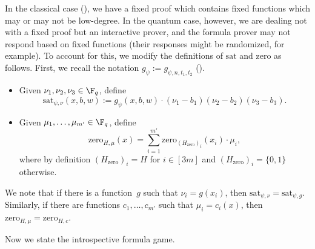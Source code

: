 \begin{notation}\label{not:annoying-technicality}
In the classical case (),
we have a fixed proof which contains fixed functions which may or may not be low-degree.
In the quantum case, however, we are dealing not with a fixed proof but an interactive prover,
and the formula prover may not respond based on fixed functions (their responses might be randomized, for example).
To account for this, we modify the definitions of $\mathrm{sat}$ and $\mathrm{zero}$ as follows.
First, we recall the notation $g_\psi := g_{\psi, n, t_1, t_2}$ (). 
\begin{itemize}
	\item[$\circ$] Given $\nu_1, \nu_2, \nu_3 \in \F_q$, define
		\begin{equation*}
			\mathrm{sat}_{\psi, \nu}(x, b, w) := g_{\psi}(x, b, w) \cdot (\nu_1 - b_1) (\nu_2 - b_2) (\nu_3 - b_3).
		\end{equation*}
	\item[$\circ$] Given $\mu_1, \ldots, \mu_{m'} \in \F_q$, define
		\begin{equation*}
			\mathrm{zero}_{H, \mu}(x) = \sum_{i=1}^{m'} \mathrm{zero}_{(H_{\mathrm{zero}})_i}(x_i) \cdot \mu_i,
		\end{equation*}
		where by definition $(H_{\mathrm{zero}})_i = H$ for $i \in [3m]$ and $(H_{\mathrm{zero}})_i = \{0, 1\}$ otherwise.
\end{itemize}
We note that if there is a function~$g$ such that $\nu_i = g(x_i)$, then $\mathrm{sat}_{\psi, \nu} = \mathrm{sat}_{\psi, g}$.
Similarly, if there are functions $c_1, \ldots, c_{m'}$ such that $\mu_i = c_i(x)$, then $\mathrm{zero}_{H, \mu} = \mathrm{zero}_{H, c}$.
\end{notation}

Now we state the introspective formula game.

